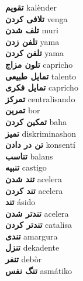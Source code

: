 \textbf{ تقویم  } kalènder \\
\textbf{ تلافی کردن  } venga \\
\textbf{ تلف شدن  } muri \\
\textbf{ تلفن زدن  } yama \\
\textbf{ تلفن کردن  } yama \\
\textbf{ تلون مزاج  } capricho \\
\textbf{ تمایل طبیعی  } talento \\
\textbf{ تمایل فکری  } capricho \\
\textbf{ تمرکز  } centralisando \\
\textbf{ تمرین  } bor \\
\textbf{ تمکین کردن  } baha \\
\textbf{ تمیز  } diskriminashon \\
\textbf{ تن در دادن  } konsentí \\
\textbf{ تناسب  } balans \\
\textbf{ تنبیه  } castigo \\
\textbf{ تند شدن  } acelera \\
\textbf{ تند کردن  } acelera \\
\textbf{ تند  } ásido \\
\textbf{ تندتر شدن  } acelera \\
\textbf{ تندتر کردن  } catalisa \\
\textbf{ تندی  } amargura \\
\textbf{ تنزل  } dekadente \\
\textbf{ تنفر  } debòr \\
\textbf{ تنگ نفس  } asmátiko \\
